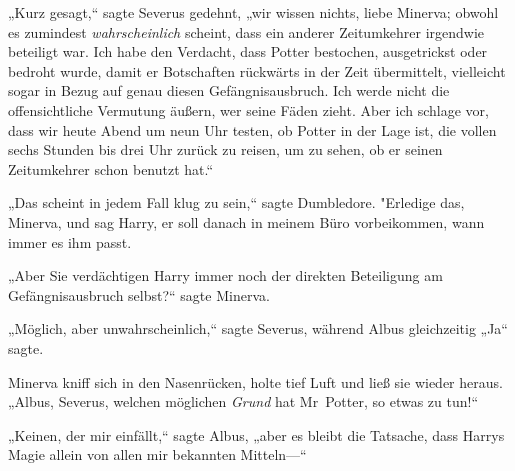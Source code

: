 „Kurz gesagt,“ sagte Severus gedehnt, „wir wissen nichts, liebe Minerva; obwohl es zumindest \emph{wahrscheinlich} scheint, dass ein anderer Zeitumkehrer irgendwie beteiligt war. Ich habe den Verdacht, dass Potter bestochen, ausgetrickst oder bedroht wurde, damit er Botschaften rückwärts in der Zeit übermittelt, vielleicht sogar in Bezug auf genau diesen Gefängnisausbruch. Ich werde nicht die offensichtliche Vermutung äußern, wer seine Fäden zieht. Aber ich schlage vor, dass wir heute Abend um neun Uhr testen, ob Potter in der Lage ist, die vollen sechs Stunden bis drei Uhr zurück zu reisen, um zu sehen, ob er seinen Zeitumkehrer schon benutzt hat.“

„Das scheint in jedem Fall klug zu sein,“ sagte Dumbledore. "Erledige das, Minerva, und sag Harry, er soll danach in meinem Büro vorbeikommen, wann immer es ihm passt.

„Aber Sie verdächtigen Harry immer noch der direkten Beteiligung am Gefängnisausbruch selbst?“ sagte Minerva.

„Möglich, aber unwahrscheinlich,“ sagte Severus, während Albus gleichzeitig „Ja“ sagte.

Minerva kniff sich in den Nasenrücken, holte tief Luft und ließ sie wieder heraus. „Albus, Severus, welchen möglichen \emph{Grund} hat Mr~Potter, so etwas zu tun!“

„Keinen, der mir einfällt,“ sagte Albus, „aber es bleibt die Tatsache, dass Harrys Magie allein von allen mir bekannten Mitteln—“

